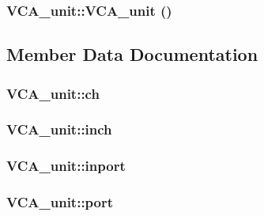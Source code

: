\hypertarget{classVCA__unit_0ecfa0ee48defa11d1b8fae9b35772d0}{
\subsubsection[{VCA\_\-unit}]{\setlength{\rightskip}{0pt plus 5cm}VCA\_\-unit::VCA\_\-unit ()}}
\label{classVCA__unit_0ecfa0ee48defa11d1b8fae9b35772d0}




\subsection{Member Data Documentation}
\hypertarget{classVCA__unit_4fa607fe21eb468c122cf2c8db2032a8}{
\subsubsection[{ch}]{ {\bf VCA\_\-unit::ch}}}
\label{classVCA__unit_4fa607fe21eb468c122cf2c8db2032a8}


\hypertarget{classVCA__unit_85870465ffa4fa56c2bc7fefdd018bf4}{
\subsubsection[{inch}]{ {\bf VCA\_\-unit::inch}}}
\label{classVCA__unit_85870465ffa4fa56c2bc7fefdd018bf4}


\hypertarget{classVCA__unit_05367b0e16bb2a48c24f05b74d77193a}{
\subsubsection[{inport}]{ {\bf VCA\_\-unit::inport}}}
\label{classVCA__unit_05367b0e16bb2a48c24f05b74d77193a}


\hypertarget{classVCA__unit_5f71811d7ddbb9228f66c5d616a20231}{
\subsubsection[{port}]{ {\bf VCA\_\-unit::port}}}
\label{classVCA__unit_5f71811d7ddbb9228f66c5d616a20231}




